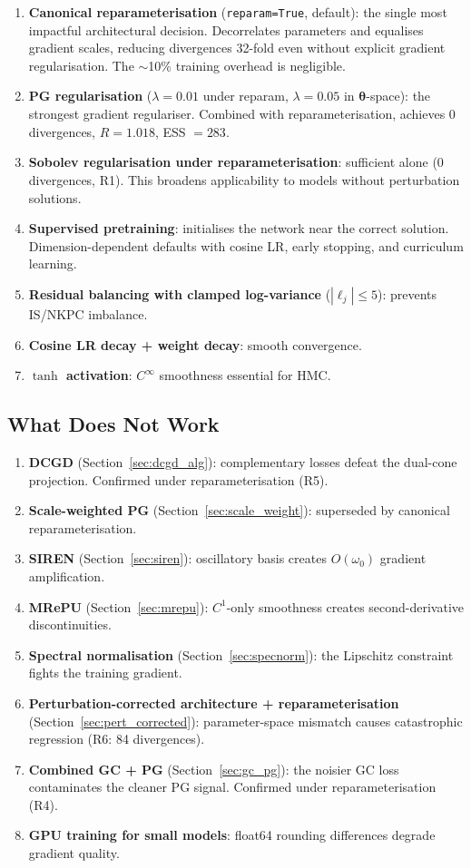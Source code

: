 \documentclass[11pt,a4paper]{article}
\theoremstyle{definition}
\newcommand{\btheta}{\boldsymbol{\theta}}
\newcommand{\code}[1]{\texttt{\color{codecolor}#1}}
\begin{document}
	\begin{enumerate}[nosep]
		\item \textbf{Canonical reparameterisation} (\code{reparam=True}, default): the single most impactful architectural decision.
		Decorrelates parameters and equalises gradient scales, reducing divergences 32-fold even without explicit gradient regularisation.
		The $\sim$10\% training overhead is negligible.
		\item \textbf{PG regularisation} ($\lambda = 0.01$ under reparam, $\lambda = 0.05$ in $\btheta$-space): the strongest gradient regulariser.
		Combined with reparameterisation, achieves 0 divergences, $\hat{R} = 1.018$, ESS $= 283$.
		\item \textbf{Sobolev regularisation under reparameterisation}: sufficient alone (0 divergences, R1).
		This broadens applicability to models without perturbation solutions.
		\item \textbf{Supervised pretraining}: initialises the network near the correct solution.
		Dimension-dependent defaults with cosine LR, early stopping, and curriculum learning.
		\item \textbf{Residual balancing with clamped log-variance} ($|\ell_j| \leq 5$): prevents IS/NKPC imbalance.
		\item \textbf{Cosine LR decay + weight decay}: smooth convergence.
		\item \textbf{$\tanh$ activation}: $C^\infty$ smoothness essential for HMC.
	\end{enumerate}
	
	\subsection{What Does Not Work}
	
	\begin{enumerate}[nosep]
		\item \textbf{DCGD} (Section~\ref{sec:dcgd_alg}): complementary losses defeat the dual-cone projection.
		Confirmed under reparameterisation (R5).
		\item \textbf{Scale-weighted PG} (Section~\ref{sec:scale_weight}): superseded by canonical reparameterisation.
		\item \textbf{SIREN} (Section~\ref{sec:siren}): oscillatory basis creates $O(\omega_0)$ gradient amplification.
		\item \textbf{MRePU} (Section~\ref{sec:mrepu}): $C^1$-only smoothness creates second-derivative discontinuities.
		\item \textbf{Spectral normalisation} (Section~\ref{sec:specnorm}): the Lipschitz constraint fights the training gradient.
		\item \textbf{Perturbation-corrected architecture + reparameterisation} (Section~\ref{sec:pert_corrected}): parameter-space mismatch causes catastrophic regression (R6: 84 divergences).
		\item \textbf{Combined GC + PG} (Section~\ref{sec:gc_pg}): the noisier GC loss contaminates the cleaner PG signal.
		Confirmed under reparameterisation (R4).
		\item \textbf{GPU training for small models}: float64 rounding differences degrade gradient quality.
	\end{enumerate}
	
\end{document}
